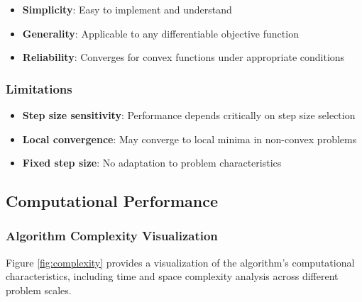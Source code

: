 \documentclass[
]{article}
\providecommand{\tightlist}{%
  \setlength{\itemsep}{0pt}\setlength{\parskip}{0pt}}
\begin{document}
\begin{itemize}
\tightlist
\item
  \textbf{Simplicity}: Easy to implement and understand
\item
  \textbf{Generality}: Applicable to any differentiable objective
  function
\item
  \textbf{Reliability}: Converges for convex functions under appropriate
  conditions
\end{itemize}

\subsubsection{Limitations}\label{limitations}

\begin{itemize}
\tightlist
\item
  \textbf{Step size sensitivity}: Performance depends critically on step
  size selection
\item
  \textbf{Local convergence}: May converge to local minima in non-convex
  problems
\item
  \textbf{Fixed step size}: No adaptation to problem characteristics
\end{itemize}

\subsection{Computational Performance}\label{computational-performance}

\subsubsection{Algorithm Complexity
Visualization}\label{algorithm-complexity-visualization}

Figure \ref{fig:complexity} provides a visualization of the algorithm's
computational characteristics, including time and space complexity
analysis across different problem scales.
\end{document}
